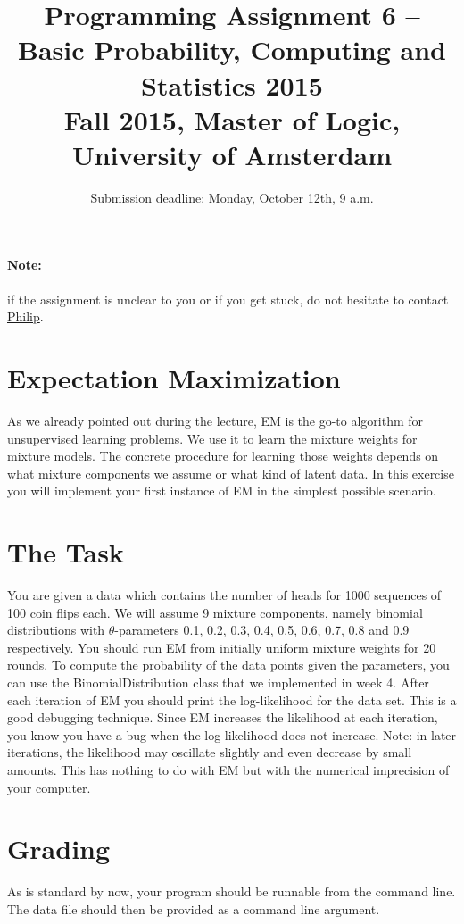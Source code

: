 \documentclass[11pt, leqno, a4paper]{article}
\title{Programming Assignment 6 -- Basic Probability, Computing and Statistics 2015 \\[2mm]
\large{Fall 2015, Master of Logic, University of Amsterdam}}
\author{}
\date{Submission deadline: Monday, October 12th, 9 a.m.}
\begin{document}
\maketitle

\paragraph{Note:} if the assignment is unclear to you or if you get stuck, do not hesitate to contact \href{mailto:P.Schulz@uva.nl}{Philip}.

\section{Expectation Maximization}

As we already pointed out during the lecture, EM is the go-to algorithm for unsupervised learning problems.
We use it to learn the mixture weights for mixture models. The concrete procedure for learning those
weights depends on what mixture components we assume or what kind of latent data. In this exercise
you will implement your first instance of EM in the simplest possible scenario. 

\section{The Task}

You are given a data which contains the number of heads for 1000 sequences of 100 coin flips each. 
We will assume 9 mixture components, namely binomial distributions with $ \theta $-parameters 0.1, 
0.2, 0.3, 0.4, 0.5, 0.6, 0.7, 0.8 and 0.9 respectively. You should run EM from initially uniform
mixture weights for 20 rounds. To compute the probability of the data points given the parameters,
you can use the BinomialDistribution class that we implemented in week 4. After each iteration
of EM you should print the log-likelihood for the data set. This is a good debugging technique.
Since EM increases the likelihood at each iteration, you know you have a bug when the
log-likelihood does not increase. Note: in later iterations, the likelihood may oscillate slightly
and even decrease by small amounts. This has nothing to do with EM but with the numerical imprecision
of your computer.

\section{Grading}

As is standard by now, your program should be runnable from the command line. The data file should then
be provided as a command line argument.
\end{document}
